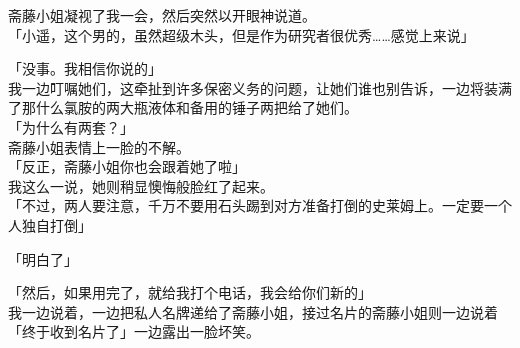 斋藤小姐凝视了我一会，然后突然以开眼神说道。\\

「小遥，这个男的，虽然超级木头，但是作为研究者很优秀……感觉上来说」

「没事。我相信你说的」\\

我一边叮嘱她们，这牵扯到许多保密义务的问题，让她们谁也别告诉，一边将装满了那什么氯胺的两大瓶液体和备用的锤子两把给了她们。\\

「为什么有两套？」\\

斋藤小姐表情上一脸的不解。\\

「反正，斋藤小姐你也会跟着她了啦」\\

我这么一说，她则稍显懊悔般脸红了起来。\\

「不过，两人要注意，千万不要用石头踢到对方准备打倒的史莱姆上。一定要一个人独自打倒」

「明白了」

「然后，如果用完了，就给我打个电话，我会给你们新的」\\

我一边说着，一边把私人名牌递给了斋藤小姐，接过名片的斋藤小姐则一边说着「终于收到名片了」一边露出一脸坏笑。\\


